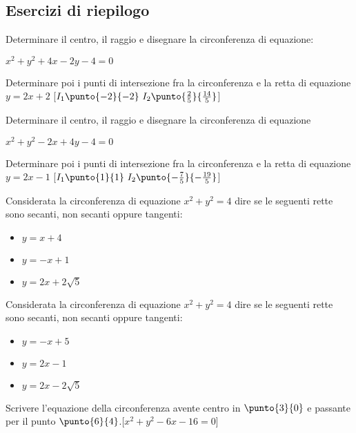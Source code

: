 \subsection{Esercizi di riepilogo}

\begin{esercizio}\label{ese:}
Determinare il centro, il raggio e disegnare la circonferenza di equazione:

\(x^2+y^2+4x-2y-4=0\)

Determinare poi i punti di intersezione fra la circonferenza e la retta di 
equazione 
\(y=2x+2\) 
\hfill [\(I_1\punto{-2}{-2}~I_2\punto{\frac{2}{5}}{\frac{14}{5}}\)]
\end{esercizio}

\begin{esercizio}\label{ese:}
Determinare il centro, il raggio e disegnare la circonferenza di equazione

\(x^2+y^2-2x+4y-4=0\)

Determinare poi i punti di intersezione fra la circonferenza e la retta di 
equazione \(y=2x-1\) 
\hfill [\(I_1\punto{1}{1}~I_2\punto{-\frac{7}{5}}{-\frac{19}{5}}\)]
\end{esercizio}

\begin{esercizio}\label{ese:}
Considerata la circonferenza di equazione \(x^2 +y^2 = 4\) dire se le seguenti 
rette sono secanti, non secanti oppure tangenti:
\begin{itemize} [nosep]
 \item \(y=x+4\)
 \item \(y=-x+1\)
 \item \(y=2x+2\sqrt{5}\)
\end{itemize}
\end{esercizio}

\begin{esercizio}\label{ese:}
Considerata la circonferenza di equazione \(x^2 +y^2 = 4\) dire se le seguenti 
rette sono secanti, non secanti oppure tangenti:
\begin{itemize} [nosep]
 \item \(y=-x+5\)
 \item \(y=2x-1\)
 \item \(y=2x-2\sqrt{5}\)
\end{itemize}
\end{esercizio}

\begin{esercizio}\label{ese:}
Scrivere l'equazione della circonferenza avente centro in \(\punto{3}{0}\) e 
passante per il punto \(\punto{6}{4}\).\hfill[\(x^2+y^2-6x-16=0\)]
\end{esercizio}

